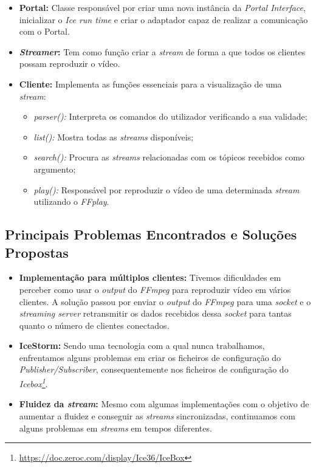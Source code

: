 \documentclass{article}
\begin{document}
\begin{itemize}
\item \textbf{Portal:} Classe responsável por criar uma nova instância da \textit{Portal Interface}, inicializar o \textit{Ice run time} e criar o adaptador capaz de realizar a comunicação com o Portal.
\item \textbf{\textit{Streamer}:} Tem como função criar a \textit{stream} de forma a que todos os clientes possam reproduzir o vídeo.
\item \textbf{Cliente:} Implementa as funções essenciais para a visualização de uma \textit{stream}:
	\begin{itemize}
	\item \textit{parser():} Interpreta os comandos do utilizador verificando a sua validade;
	\item \textit{list():} Mostra todas as \textit{streams} disponíveis;
	\item \textit{search():} Procura as \textit{streams} relacionadas com os tópicos recebidos como argumento;
	\item \textit{play():} Responsável por reproduzir o vídeo de uma determinada \textit{stream} utilizando o \textit{FFplay}.
	\end{itemize}
\end{itemize}


\subsection{Principais Problemas Encontrados e Soluções Propostas}

\begin{itemize}
\item \textbf{Implementação para múltiplos clientes:} Tivemos dificuldades em perceber como usar o \textit{output} do \textit{FFmpeg} para reproduzir vídeo em vários clientes. A solução passou por enviar o \textit{output} do \textit{FFmpeg} para uma \textit{socket} e o \textit{streaming server} retransmitir os dados recebidos dessa \textit{socket} para tantas quanto o número de clientes conectados.
\item \textbf{IceStorm:} Sendo uma tecnologia com a qual nunca trabalhamos, enfrentamos alguns problemas em criar os ficheiros de configuração do \textit{Publisher/Subscriber}, consequentemente nos ficheiros de configuração do \textit{Icebox\footnote{\url{https://doc.zeroc.com/display/Ice36/IceBox}}}. 
\item \textbf{Fluidez da \textit{stream}:} Mesmo com algumas implementações com o objetivo de aumentar a fluidez e conseguir as \textit{streams} sincronizadas, continuamos com alguns problemas em \textit{streams} em tempos diferentes.
\end{itemize}
\end{document}

